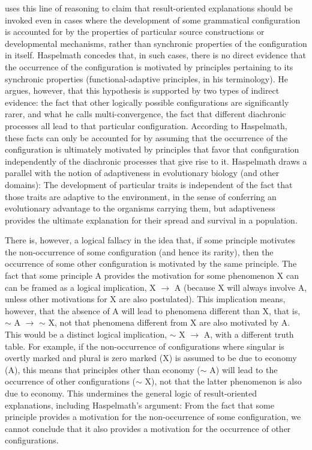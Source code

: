 \documentclass[output=paper]{langsci/langscibook}
\begin{document}
 uses this line of reasoning to claim that
result-oriented explanations  should be invoked even in cases where
the development of some grammatical configuration is accounted
for by the properties of particular source constructions or developmental
mechanisms, rather than synchronic properties of the configuration in itself.  Haspelmath concedes that, in such cases,
there is no direct evidence that the occurrence of the
configuration is motivated by principles pertaining to its synchronic
properties (functional-adaptive principles, in his terminology). He argues, however, that this
hypothesis is supported by two types of indirect evidence: the fact
that other logically possible configurations are significantly rarer, and what he calls
multi-convergence, the fact that different  diachronic processes all
lead to that particular configuration. According to Haspelmath, these facts
can only be accounted for by assuming that the occurrence of
the configuration is ultimately motivated by
principles that favor that configuration independently of the
diachronic processes that give rise to it.
 Haspelmath draws a parallel with the notion
of adaptiveness in evolutionary biology (and other domains):
The development of particular traits is independent of the fact that
those traits are adaptive to the environment, in the sense of conferring an evolutionary advantage to the organisms
carrying them, but adaptiveness provides the ultimate explanation for their
spread and survival in a population.

There is, however, a logical fallacy in the idea that, if some
 principle motivates the  non-occurrence of some
configuration (and hence its rarity),
then the occurrence of some other configuration is motivated by the
same principle. The fact that some principle A provides the motivation
for some phenomenon X can can be framed as a logical implication,  X
$\rightarrow$ A (because X will always involve A, unless other
motivations for X are also postulated).  This
implication means, however, that the absence of A will lead to phenomena different
than X, that is, $\sim$ A $\rightarrow$ $\sim$ X, not that phenomena
different from X are also motivated by A. This would be a distinct logical
implication, $\sim$ X $\rightarrow$ A, with a different truth table.
For example, if the non-occurrence
of configurations where singular is
overtly marked and plural is zero marked (X)  is assumed to be due to
economy (A), this means that principles other than economy ($\sim$ A) will lead to the occurrence of other configurations ($\sim$ X), not that
the latter phenomenon is also due to economy. This undermines the general
logic of result-oriented explanations, including Haspelmath's
argument: From the fact that some principle provides 
a motivation for the non-occurrence of some
configuration, we cannot conclude that it also provides a
motivation for the occurrence of other configurations.
\end{document}

